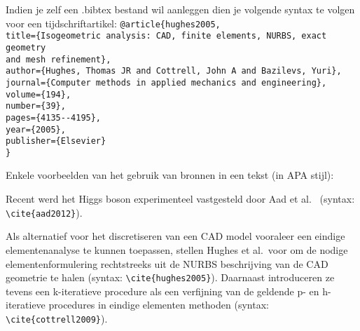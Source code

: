 Indien je zelf een .bibtex bestand wil aanleggen dien je volgende syntax te volgen voor een tijdschriftartikel:
\clearpage
\verb|@article{hughes2005,|\\
\verb|title={Isogeometric analysis: CAD, finite elements, NURBS, exact geometry|\\ \verb|and mesh refinement},|\\
\verb|author={Hughes, Thomas JR and Cottrell, John A and Bazilevs, Yuri},|\\
\verb|journal={Computer methods in applied mechanics and engineering},|\\
\verb|volume={194},|\\
\verb|number={39},|\\
\verb|pages={4135--4195},|\\
\verb|year={2005},|\\
\verb|publisher={Elsevier}|\\
\verb|}|

Enkele voorbeelden van het gebruik van bronnen in een tekst (in APA stijl): 

Recent werd het Higgs boson experimenteel vastgesteld door Aad et al.\ \cite{aad2012} (syntax: \verb|\cite{aad2012}|). 

Als alternatief voor het discretiseren van een CAD model vooraleer een eindige elementenanalyse te kunnen toepassen, stellen Hughes et al.\ voor om de nodige elementenformulering rechtstreeks uit de NURBS beschrijving van de CAD geometrie te halen \cite{hughes2005} (syntax: \verb|\cite{hughes2005}|). Daarnaast introduceren ze tevens een k-iteratieve procedure als een verfijning van de geldende p- en h-iteratieve procedures in eindige elementen methoden \cite{cottrell2009} (syntax: \verb|\cite{cottrell2009}|).